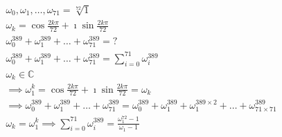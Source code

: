 \documentclass{article}
\begin{document}
    \begin{align*}
        \omega_0, \omega_1, \dots, \omega_{71} = \sqrt[72]{1}\\
        \omega_k = \cos{\frac{2k\pi}{72}} + \imath\sin{\frac{2k\pi}{72}}\\
        \omega_0 ^ {389} + \omega_1 ^ {389} + \dots + \omega_{71} ^ {389} = ?\\
        \omega_0 ^ {389} + \omega_1 ^ {389} + \dots + \omega_{71} ^ {389} = \displaystyle\sum_{i=0}^{71} \omega_i ^ {389}\\
        \omega_k \in \mathbb{C}\\
        \implies \omega_1 ^ k = \cos{\frac{2k\pi}{72}} + \imath\sin{\frac{2k\pi}{72}} = \omega_k\\
        \implies \omega_0 ^ {389} + \omega_1 ^ {389} + \dots + \omega_{71} ^ {389} = \omega_0 ^ {389} + \omega_1 ^ {389} + \omega_1 ^ {389 \times 2} + \dots + \omega_{71 \times 71} ^ {389}\\
        \omega_k = \omega_1 ^ k \implies \displaystyle\sum_{i=0}^{71} \omega_i ^ {389} = \frac{\omega_1 ^ {72} - 1}{\omega_1 - 1}
    \end{align*}
\end{document}
